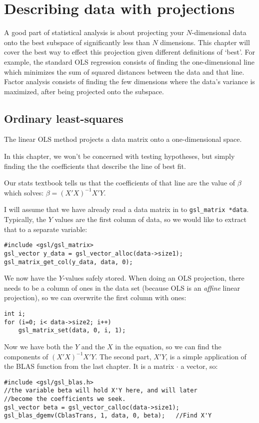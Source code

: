 \chapter{Describing data with projections} \label{projections}

A good part of statistical analysis is about projecting your
$N$-dimensional data onto the best subspace of significantly less than
$N$ dimensions. This chapter will cover the best way to effect this projection
given different definitions of `best'.
 For example, the standard OLS regression consists of
finding the one-dimensional line which minimizes the sum of squared
distances between the data and that line. Factor analysis consists
of finding the few dimensions where the data's variance is maximized, after being
projected onto the subspace.

\section{Ordinary least-squares} The linear OLS method
projects a data matrix onto a one-dimensional space. 



In this chapter, we won't be concerned with testing hypotheses, but simply finding the 
the coefficients that describe the line of best fit.

Our stats textbook tells us that the coefficients of  that line are the value of $\beta$ which solves:
$ \beta = (X'X)^{-1}X'Y$.

I will assume that we have already read a data matrix in to {\tt gsl\_matrix *data}. Typically, the $Y$
values are the first column of data, so we would like to extract that to a separate variable:
\begin{verbatim}
#include <gsl/gsl_matrix>
gsl_vector y_data = gsl_vector_alloc(data->size1);
gsl_matrix_get_col(y_data, data, 0);
\end{verbatim}

We now have the $Y$-values safely stored. When doing an OLS projection, there needs to be a column of
ones in the data set (because OLS is an {\sl affine} linear projection), so we can overwrite the first
column with ones:
\begin{verbatim}
int i;
for (i=0; i< data->size2; i++)
    gsl_matrix_set(data, 0, i, 1);
\end{verbatim}

Now we have both the $Y$ and the $X$ in the equation, so we can find the components of $(X'X)^{-1}X'Y$.
The second part, $X'Y$, is a simple application of the BLAS function from the last chapter. It is a
matrix $\cdot$ a vector, so:
\begin{verbatim}
#include <gsl/gsl_blas.h>
//the variable beta will hold X'Y here, and will later
//become the coefficients we seek.
gsl_vector beta = gsl_vector_calloc(data->size1);
gsl_blas_dgemv(CblasTrans, 1, data, 0, beta);	//Find X'Y
\end{verbatim}

